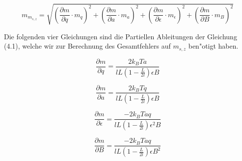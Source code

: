 \documentclass[a4paper,parskip,11pt, DIV12]{scrreprt}
\begin{document}
\begin{equation}
m_{m_{s,z}}=\sqrt{(\frac{\partial m}{\partial q} \cdot m_q)^2+(\frac{\partial m}{\partial a} \cdot m_a)^2+(\frac{\partial m}{\partial \epsilon} \cdot m_\epsilon)^2+(\frac{\partial m}{\partial B} \cdot m_B)^2}
\end{equation}

Die folgenden vier Gleichungen sind die Partiellen Ableitungen der Gleichung (4.1), welche wir zur Berechnung des Gesamtfehlers auf $m_{s,z}$ ben"otigt haben.

\begin{equation}
\frac{\partial m}{\partial q} = \frac{2k_BTa}{lL(1-\frac{L}{2l})\epsilon B}
\end{equation}

\begin{equation}
\frac{\partial m}{\partial a} = \frac{2k_BTq}{lL(1-\frac{L}{2l})\epsilon B}
\end{equation}

\begin{equation}
\frac{\partial m}{\partial \epsilon} = \frac{-2k_BTaq}{lL(1-\frac{L}{2l})\epsilon^2 B}
\end{equation}

\begin{equation}
\frac{\partial m}{\partial B} = \frac{-2k_BTaq}{lL(1-\frac{L}{2l})\epsilon B^2}
\end{equation}


\clearpage
 

\end{document}
